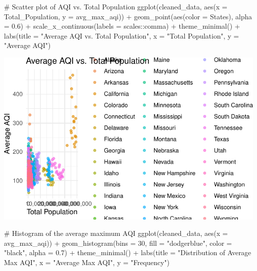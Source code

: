 \documentclass[
  12pt,
]{article}
\newenvironment{Shaded}{\begin{snugshade}}{\end{snugshade}}
\newcommand{\AttributeTok}[1]{\textcolor[rgb]{0.40,0.45,0.13}{#1}}
\newcommand{\CommentTok}[1]{\textcolor[rgb]{0.37,0.37,0.37}{#1}}
\newcommand{\DecValTok}[1]{\textcolor[rgb]{0.68,0.00,0.00}{#1}}
\newcommand{\FloatTok}[1]{\textcolor[rgb]{0.68,0.00,0.00}{#1}}
\newcommand{\FunctionTok}[1]{\textcolor[rgb]{0.28,0.35,0.67}{#1}}
\newcommand{\NormalTok}[1]{\textcolor[rgb]{0.00,0.23,0.31}{#1}}
\newcommand{\SpecialCharTok}[1]{\textcolor[rgb]{0.37,0.37,0.37}{#1}}
\newcommand{\StringTok}[1]{\textcolor[rgb]{0.13,0.47,0.30}{#1}}
\begin{document}
\begin{Shaded}
\begin{Highlighting}[]
\CommentTok{\# Scatter plot of AQI vs. Total Population}
\FunctionTok{ggplot}\NormalTok{(cleaned\_data, }\FunctionTok{aes}\NormalTok{(}\AttributeTok{x =}\NormalTok{ Total\_Population, }\AttributeTok{y =}\NormalTok{ avg\_max\_aqi)) }\SpecialCharTok{+}
  \FunctionTok{geom\_point}\NormalTok{(}\FunctionTok{aes}\NormalTok{(}\AttributeTok{color =}\NormalTok{ States), }\AttributeTok{alpha =} \FloatTok{0.6}\NormalTok{) }\SpecialCharTok{+}
  \FunctionTok{scale\_x\_continuous}\NormalTok{(}\AttributeTok{labels =}\NormalTok{ scales}\SpecialCharTok{::}\NormalTok{comma) }\SpecialCharTok{+}
  \FunctionTok{theme\_minimal}\NormalTok{() }\SpecialCharTok{+}
  \FunctionTok{labs}\NormalTok{(}\AttributeTok{title =} \StringTok{"Average AQI vs. Total Population"}\NormalTok{, }\AttributeTok{x =} \StringTok{"Total Population"}\NormalTok{, }\AttributeTok{y =} \StringTok{"Average AQI"}\NormalTok{)}
\end{Highlighting}
\end{Shaded}

\includegraphics{final_main_quarto_presentation_files/figure-pdf/unnamed-chunk-6-1.pdf}

\begin{Shaded}
\begin{Highlighting}[]
\CommentTok{\# Histogram of the average maximum AQI}
\FunctionTok{ggplot}\NormalTok{(cleaned\_data, }\FunctionTok{aes}\NormalTok{(}\AttributeTok{x =}\NormalTok{ avg\_max\_aqi)) }\SpecialCharTok{+}
  \FunctionTok{geom\_histogram}\NormalTok{(}\AttributeTok{bins =} \DecValTok{30}\NormalTok{, }\AttributeTok{fill =} \StringTok{"dodgerblue"}\NormalTok{, }\AttributeTok{color =} \StringTok{"black"}\NormalTok{, }\AttributeTok{alpha =} \FloatTok{0.7}\NormalTok{) }\SpecialCharTok{+}
  \FunctionTok{theme\_minimal}\NormalTok{() }\SpecialCharTok{+}
  \FunctionTok{labs}\NormalTok{(}\AttributeTok{title =} \StringTok{"Distribution of Average Max AQI"}\NormalTok{, }\AttributeTok{x =} \StringTok{"Average Max AQI"}\NormalTok{, }\AttributeTok{y =} \StringTok{"Frequency"}\NormalTok{)}
\end{Highlighting}
\end{Shaded}
\end{document}
